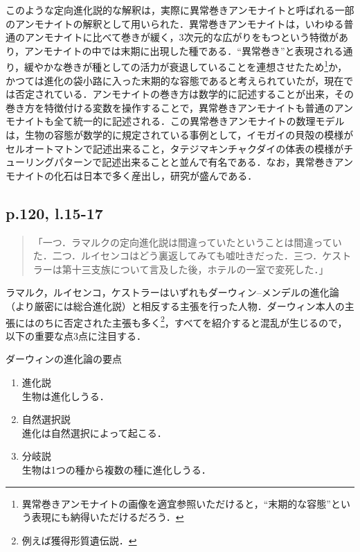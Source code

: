 \documentclass[10pt, a5paper, twoside]{ltjsarticle}
\newcommand{\hyphen}{\insertkanjiskip--\insertkanjiskip}
\begin{document}
            このような定向進化説的な解釈は，実際に異常巻きアンモナイトと呼ばれる一部のアンモナイトの解釈として用いられた．異常巻きアンモナイトは，いわゆる普通のアンモナイトに比べて巻きが緩く，3次元的な広がりをもつという特徴があり，アンモナイトの中では末期に出現した種である．“異常巻き”と表現される通り，緩やかな巻きが種としての活力が衰退していることを連想させたため\footnote{異常巻きアンモナイトの画像を適宜参照いただけると，“末期的な容態”という表現にも納得いただけるだろう．}か，かつては進化の袋小路に入った末期的な容態であると考えられていたが，現在では否定されている．アンモナイトの巻き方は数学的に記述することが出来，その巻き方を特徴付ける変数を操作することで，異常巻きアンモナイトも普通のアンモナイトも全て統一的に記述される\cite{okamoto,matsumoto}．この異常巻きアンモナイトの数理モデルは，生物の容態が数学的に規定されている事例として，イモガイの貝殻の模様がセルオートマトンで記述出来ること，タテジマキンチャクダイの体表の模様がチューリングパターンで記述出来ることと並んで有名である．なお，異常巻きアンモナイトの化石は日本で多く産出し，研究が盛んである．

        \subsection{p.120, l.15-17}

            \begin{quote}
                「一つ．ラマルクの定向進化説は間違っていたということは間違っていた．二つ．ルイセンコはどう裏返してみても嘘吐きだった．三つ．ケストラーは第十三支族について言及した後，ホテルの一室で変死した．」
            \end{quote}

            ラマルク，ルイセンコ，ケストラーはいずれもダーウィン\hyphen メンデルの進化論（より厳密には総合進化説）と相反する主張を行った人物．ダーウィン本人の主張にはのちに否定された主張も多く\footnote{例えば獲得形質遺伝説．}，すべてを紹介すると混乱が生じるので，以下の重要な点3点に注目する\cite{sarashina}．

            \begin{clm}{ダーウィンの進化論の要点}{}
                \begin{enumerate}
                    \item 進化説\\生物は進化しうる．
                    \item 自然選択説\\進化は自然選択によって起こる．
                    \item 分岐説\\生物は1つの種から複数の種に進化しうる．
                \end{enumerate}
            \end{clm}
\end{document}

